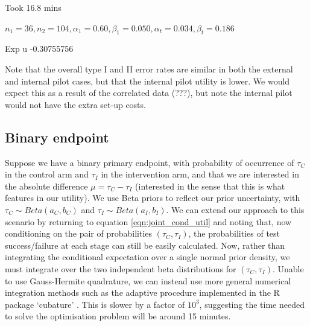 \documentclass[sagev, Crown]{sagej}
\begin{document}
Took 16.8 mins

$n_1 = 36, n_2 = 104, \alpha_1 = 0.60, \beta_1 = 0.050, \alpha_t = 0.034, \beta_t = 0.186$

Exp u -0.30755756

Note that the overall type I and II error rates are similar in both the external and internal pilot cases, but that the internal pilot utility is lower. We would expect this as a result of the correlated data (???), but note the internal pilot would not have the extra set-up costs.



\subsection{Binary endpoint}

Suppose we have a binary primary endpoint, with probability of occurrence of $\tau_C$ in the control arm and $\tau_I$ in the intervention arm, and that we are interested in the absolute difference $\mu = \tau_C - \tau_I$ (interested in the sense that this is what features in our utility). We use Beta priors to reflect our prior uncertainty, with $\tau_C \sim Beta(a_C, b_C)$ and $\tau_I \sim Beta(a_I, b_I)$. We can extend our approach to this scenario by returning to equation \ref{eqn:joint_cond_util} and noting that, now conditioning on the pair of probabilities $(\tau_C, \tau_I)$, the probabilities of test success/failure at each stage can still be easily calculated. Now, rather than integrating the conditional expectation over a single normal prior density, we must integrate over the two independent beta distributions for $(\tau_C, \tau_I)$. Unable to use Gauss-Hermite quadrature, we can instead use more general numerical integration methods such as the adaptive procedure implemented in the R package `cubature' \cite{Narasimhan2018}. This is slower by a factor of $10^3$, suggesting the time needed to solve the optimisation problem will be around 15 minutes.
\end{document}
